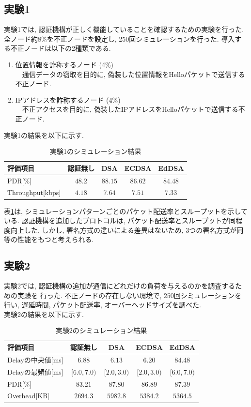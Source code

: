 \documentclass[a4j,9pt,twocolumn]{jsarticle}
\begin{document}
\subsection{実験1}
実験1では, 認証機構が正しく機能していることを確認するための実験を行った. 
全ノード約8\%を不正ノードを設定し, 250回シミュレーションを行った. 
導入する不正ノードは以下の2種類である. 
\begin{enumerate}
    \item 位置情報を詐称するノード (4\%)\\
    \indent 　通信データの窃取を目的に, 偽装した位置情報をHelloパケットで送信する不正ノード. 
    \item IPアドレスを詐称するノード (4\%)\\
    \indent 　不正アクセスを目的に, 偽装したIPアドレスをHelloパケットで送信する不正ノード. 
\end{enumerate}
実験1の結果を以下に示す.
\begin{table}[h]
    \centering
    \caption{実験1のシミュレーション結果}
    \label{tab:exp1} 
    \begin{tabular}{lcccc} \hline
        評価項目 & 認証無し & DSA & ECDSA & EdDSA \\ \hline \hline
        PDR[\%] & $48.2$ & $88.15$ & $86.62$ & $84.48$ \\
        Throughput[kbps] & $4.18$ & $7.64$ & $7.51$ & $7.33$ \\ \hline
    \end{tabular}
\end{table}

表\ref{tab:exp1}は, シミュレーションパターンごとのパケット配送率とスループットを示している. 
認証機構を追加したプロトコルは, パケット配送率とスループットが同程度向上した. 
しかし, 署名方式の違いによる差異はないため, 3つの署名方式が同等の性能をもつと考えられる. 

\subsection{実験2}
\indent 実験2では, 認証機構の追加が通信にどれだけの負荷を与えるのかを調査するための実験を
行った. 不正ノードの存在しない環境で, 250回シミュレーションを行い, 遅延時間, パケット配送率, 
オーバーヘッドサイズを調べた. \\
\indent 実験2の結果を以下に示す. 
\vspace{-3mm}
\begin{table}[h]
    \centering
    \caption{実験2のシミュレーション結果}
    \label{tab:exp2} 
    \begin{tabular}{lcccc} \hline
        評価項目 & 認証無し & DSA & ECDSA & EdDSA \\ \hline \hline
        Delayの中央値[ms] & $6.88$ & $6.13$ & $6.20$ & $84.48$ \\
        Delayの最頻値[ms] & $[6.0, 7.0)$ & $[2.0, 3.0)$ & $[2.0, 3.0)$ & $[6.0, 7.0)$ \\
        PDR[\%] & $83.21$ & $87.80$ & $86.89$ & $87.39$ \\
        Overhead[KB] & $2694.3$ & $5982.8$ & $5384.2$ & $5364.5$ \\ \hline
    \end{tabular}
\end{table}
\end{document}
